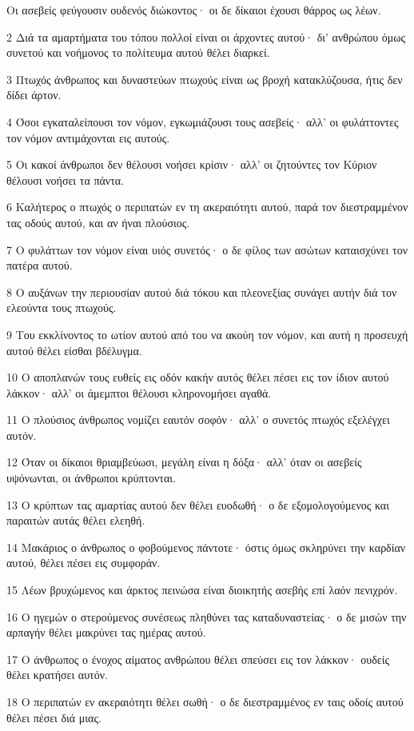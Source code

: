 \par Οι ασεβείς φεύγουσιν ουδενός διώκοντος· οι δε δίκαιοι έχουσι θάρρος ως λέων.
\par 2 Διά τα αμαρτήματα του τόπου πολλοί είναι οι άρχοντες αυτού· δι' ανθρώπου όμως συνετού και νοήμονος το πολίτευμα αυτού θέλει διαρκεί.
\par 3 Πτωχός άνθρωπος και δυναστεύων πτωχούς είναι ως βροχή κατακλύζουσα, ήτις δεν δίδει άρτον.
\par 4 Όσοι εγκαταλείπουσι τον νόμον, εγκωμιάζουσι τους ασεβείς· αλλ' οι φυλάττοντες τον νόμον αντιμάχονται εις αυτούς.
\par 5 Οι κακοί άνθρωποι δεν θέλουσι νοήσει κρίσιν· αλλ' οι ζητούντες τον Κύριον θέλουσι νοήσει τα πάντα.
\par 6 Καλήτερος ο πτωχός ο περιπατών εν τη ακεραιότητι αυτού, παρά τον διεστραμμένον τας οδούς αυτού, και αν ήναι πλούσιος.
\par 7 Ο φυλάττων τον νόμον είναι υιός συνετός· ο δε φίλος των ασώτων καταισχύνει τον πατέρα αυτού.
\par 8 Ο αυξάνων την περιουσίαν αυτού διά τόκου και πλεονεξίας συνάγει αυτήν διά τον ελεούντα τους πτωχούς.
\par 9 Του εκκλίνοντος το ωτίον αυτού από του να ακούη τον νόμον, και αυτή η προσευχή αυτού θέλει είσθαι βδέλυγμα.
\par 10 Ο αποπλανών τους ευθείς εις οδόν κακήν αυτός θέλει πέσει εις τον ίδιον αυτού λάκκον· αλλ' οι άμεμπτοι θέλουσι κληρονομήσει αγαθά.
\par 11 Ο πλούσιος άνθρωπος νομίζει εαυτόν σοφόν· αλλ' ο συνετός πτωχός εξελέγχει αυτόν.
\par 12 Όταν οι δίκαιοι θριαμβεύωσι, μεγάλη είναι η δόξα· αλλ' όταν οι ασεβείς υψόνωνται, οι άνθρωποι κρύπτονται.
\par 13 Ο κρύπτων τας αμαρτίας αυτού δεν θέλει ευοδωθή· ο δε εξομολογούμενος και παραιτών αυτάς θέλει ελεηθή.
\par 14 Μακάριος ο άνθρωπος ο φοβούμενος πάντοτε· όστις όμως σκληρύνει την καρδίαν αυτού, θέλει πέσει εις συμφοράν.
\par 15 Λέων βρυχώμενος και άρκτος πεινώσα είναι διοικητής ασεβής επί λαόν πενιχρόν.
\par 16 Ο ηγεμών ο στερούμενος συνέσεως πληθύνει τας καταδυναστείας· ο δε μισών την αρπαγήν θέλει μακρύνει τας ημέρας αυτού.
\par 17 Ο άνθρωπος ο ένοχος αίματος ανθρώπου θέλει σπεύσει εις τον λάκκον· ουδείς θέλει κρατήσει αυτόν.
\par 18 Ο περιπατών εν ακεραιότητι θέλει σωθή· ο δε διεστραμμένος εν ταις οδοίς αυτού θέλει πέσει διά μιας.
